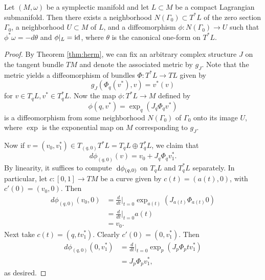 \documentclass{amsart}
\begin{document}
\begin{theorem}
    Let $(M,\omega)$ be a symplectic manifold and let $L\subset M$ be a compact
    Lagrangian submanifold. Then there exists a neighborhood $N(\Gamma_0)\subset T^*L$
    of the zero section $\Gamma_0$, a neighborhood $U\subset M$ of $L$, and a
    diffeomorphism $\phi:N(\Gamma_0)\to U$ such that $\phi^*\omega=-d\theta$ and
    $\phi|_L=\operatorname{id}$, where $\theta$ is the canonical one-form on $T^*L$.
\end{theorem}
\begin{proof}
    By Theorem \ref{thm:herm}, we can fix an arbitrary complex structure $J$ on the
    tangent bundle $TM$ and denote the associated metric by $g_J$. Note that the metric yields
    a diffeomorphism of bundles $\Phi:T^*L\to TL$ given by
    \begin{equation*}
        g_J(\Phi_q(v^*),v)=v^*(v)
    \end{equation*}
    for $v\in T_qL,v^*\in T_q^*L$. Now the map $\phi:T^*L\to M$ defined by
    \begin{equation*}
        \phi(q,v^*)=\exp_q(J_q\Phi_qv^*)
    \end{equation*}
    is a diffeomorphism from some neighborhood $N(\Gamma_0)$ of $\Gamma_0$ onto its image $U$,
    where $\exp$ is the exponential map on $M$ corresponding to $g_J$.
    
    Now if $v=(v_0,v_1^*)\in T_{(q,0)}T^*L=T_qL\oplus T_q^*L$, we claim that
    \begin{equation*}
        d\phi_{(q,0)}(v) = v_0+J_q\Phi_qv_1^*.
    \end{equation*}
    By linearity, it suffices to compute $\d\phi_{(q,0)}$ on $T_qL$ and $T_q^*L$ separately.
    In particular, let $c:[0,1]\to TM$ be a curve given by $c(t)=(a(t),0)$, with $c'(0)=(v_0,0)$.
    Then
    \begin{align*}
        d\phi_{(q,0)}(v_0,0) &= \frac{d}{dt}\bigg|_{t=0}\exp_{a(t)}\left( J_{a(t)}\Phi_{a(t)}0 \right)\\
        &=\frac{d}{dt}\bigg|_{t=0}a(t)\\
        &=v_0.
    \end{align*}
    Next take $c(t)=(q,tv_1^*)$. Clearly $c'(0)=(0,v_1^*)$. Then
    \begin{align*}
        d\phi_{(q,0)}(0,v_1^*) &= \frac{d}{dt}\bigg|_{t=0}\exp_p(J_p\Phi_p tv_1^*)\\
        &= J_p\Phi_pv_1^*,
    \end{align*}
    as desired.
    

\end{proof}
\end{document}
